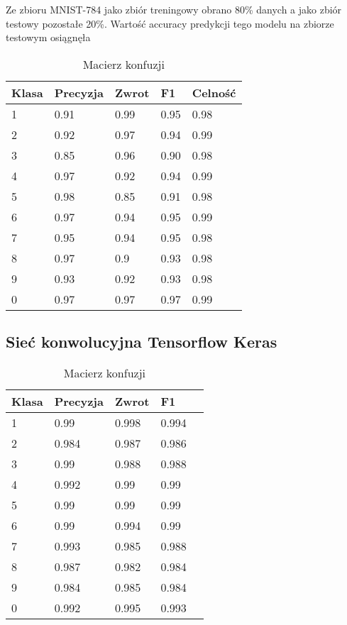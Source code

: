 \documentclass{article}
\begin{document}
\begin{table}[H]
Ze zbioru MNIST-784 jako zbiór treningowy obrano 80\% danych a 
jako zbiór testowy pozostałe 20\%. Wartość accuracy predykcji tego modelu na zbiorze testowym osiągnęła %
    \centering
    \begin{tabular}{|l|l|l|l|l|}
    \hline
    Klasa & Precyzja & Zwrot & F1 & Celność \\
    \hline
    1     & 0.91     & 0.99  & 0.95 & 0.98    \\
    2     & 0.92     & 0.97  & 0.94 & 0.99    \\
    3     & 0.85     & 0.96  & 0.90 & 0.98    \\
    4     & 0.97     & 0.92  & 0.94 & 0.99    \\
    5     & 0.98     & 0.85  & 0.91 & 0.98    \\
    6     & 0.97     & 0.94  & 0.95 & 0.99    \\
    7     & 0.95     & 0.94  & 0.95 & 0.98    \\
    8     & 0.97     & 0.9   & 0.93 & 0.98    \\
    9     & 0.93     & 0.92  & 0.93 & 0.98    \\
    0     & 0.97     & 0.97  & 0.97 & 0.99   \\
    \hline
    \end{tabular}
    \caption{Macierz konfuzji}
\end{table}

\subsection{Sieć konwolucyjna Tensorflow Keras}

\begin{table}[H]
    \centering
    \begin{tabular}{|l|l|l|l|l|}
    \hline
    Klasa & Precyzja & Zwrot & F1 \\
    \hline
    1     & 0.99     & 0.998 & 0.994 \\
    2     & 0.984    & 0.987 & 0.986 \\
    3     & 0.99     & 0.988 & 0.988 \\
    4     & 0.992    & 0.99  & 0.99  \\
    5     & 0.99     & 0.99  & 0.99  \\
    6     & 0.99     & 0.994 & 0.99  \\
    7     & 0.993    & 0.985 & 0.988 \\
    8     & 0.987    & 0.982 & 0.984 \\
    9     & 0.984    & 0.985 & 0.984 \\
    0     & 0.992    & 0.995 & 0.993 \\
    \hline
    \end{tabular}
    \caption{Macierz konfuzji}
\end{table}
\end{document}
